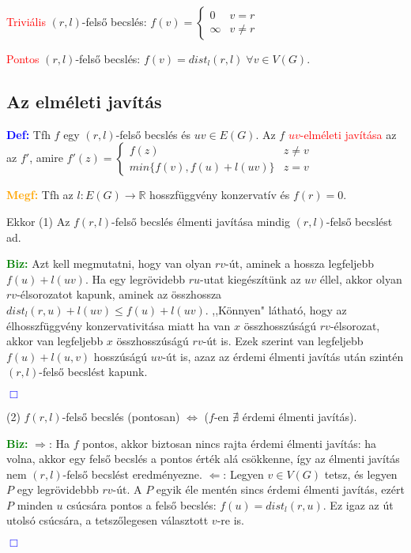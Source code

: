 \documentclass[12pt]{article}
\begin{document}
			\textcolor{red}{Triviális} $(r,l)$-felső becslés:
			$
				f(v) = \begin{cases}
					0 & v = r \\
					\infty & v \neq r
				\end{cases}
			$

			\textcolor{red}{Pontos} $(r,l)$-felső becslés: $f(v) = dist_l(r,l)\; \forall v \in V(G)$.

		\subsection{Az elméleti javítás}

			\textbf{\textcolor{blue}{Def:}} Tfh $f$ egy $(r,l)$-felső becslés és $uv \in E(G)$. Az $f$ \textcolor{red}{$uv$-elméleti javítása} az az $f'$, amire 
			$
				f'(z) = \begin{cases}
					f(z) & z \neq v \\
					min\{f(v), f(u) + l(uv)\} & z = v
				\end{cases}
			$

			\textbf{\textcolor{orange}{Megf:}} Tfh az $l:E(G)\rightarrow \mathbb{R}$ hosszfüggvény konzervatív és $f(r) = 0$. 
			
			Ekkor (1) Az $f (r,l)$-felső becslés élmenti javítása mindig $(r,l)$-felső becslést ad.

			\textbf{\textcolor{green}{Biz:}} Azt kell megmutatni, hogy van  olyan $rv$-út, aminek a hossza legfeljebb $f(u) + l(uv)$. Ha egy legrövidebb $ru$-utat kiegészítünk az $uv$ éllel, akkor olyan $rv$-élsorozatot kapunk, aminek az összhossza $dist_l (r,u) + l(uv) \leq f(u) + l(uv)$. ,,Könnyen" látható, hogy  az élhosszfüggvény konzervativitása miatt ha van $x$ összhosszúságú $rv$-élsorozat, akkor van legfeljebb $x$ összhosszúságú $rv$-út is. Ezek szerint van legfeljebb $f(u) + l(u,v)$ hosszúságú $uv$-út is, azaz az érdemi élmenti javítás után szintén $(r,l)$-felső becslést kapunk.  \raggedright \textcolor{blue}{$\Box$} 

			(2) $f (r,l)$-felső becslés (pontosan) $\Longleftrightarrow$ ($f$-en $\nexists$ érdemi élmenti javítás).

			\textcolor{green}{\textbf{Biz:}}  $\Rightarrow$: Ha $f$ pontos, akkor biztosan nincs rajta érdemi élmenti javítás: ha volna, akkor egy felső becslés a pontos érték alá csökkenne, így az élmenti javítás nem  $(r,l)$-felső becslést eredményezne. $\Leftarrow$: Legyen $v \in V(G)$ tetsz, és legyen $P$ egy legrövidebbb $rv$-út. A $P$ egyik éle mentén sincs érdemi élmenti javítás, ezért $P$ minden $u$ csúcsára pontos a felső becslés: $f(u) = dist_l(r,u)$. Ez igaz az út utolsó csúcsára, a tetszőlegesen választott $v$-re is. \raggedright \textcolor{blue}{$\Box$}
\end{document}
